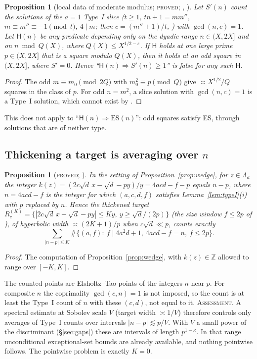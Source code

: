 \documentclass[10pt,reqno]{amsart}
\newtheorem{proposition}[theorem]{Proposition}
\theoremstyle{definition}
\numberwithin{equation}{section}
\newcommand{\Z}{\mathbb Z}
\newcommand{\status}[1]{\textup{\textsc{#1}}}
\begin{document}
\begin{proposition}[local data of moderate modulus; \status{proved}; {\cite[Prop.~7.3]{O127}}, {\cite[Lemma~5.1]{RT1}}]\label{prop:localsize}
Let $S'(n)$ count the solutions of the $a=1$ Type~I slice
($t\ge1$, $tn+1=mm''$, $m\equiv m''\equiv-1\pmod t$, $4\mid m$; then
$c=(m''+1)/t$, \cite[Lemma~1.1]{O127}) with $\gcd(n,c)=1$.
Let $\mathsf H(n)$ be any predicate depending only on the dyadic range
$n\in(X,2X]$ and on $n\bmod Q(X)$, where $Q(X)\le X^{1/2-\varepsilon}$. If
$\mathsf H$ holds at one large prime $p\in(X,2X]$ that is a square modulo
$Q(X)$, then it holds at an odd square in $(X,2X]$, where $S'=0$. Hence
``$\mathsf H(n)\Rightarrow S'(n)\ge1$'' is false for any such $\mathsf H$.
\end{proposition}
\begin{proof}
The odd $m\equiv m_0\pmod{2Q}$ with $m_0^2\equiv p\pmod Q$ give $\asymp X^{1/2}/Q$
squares in the class of $p$. For odd $n=m^2$, a slice solution with
$\gcd(n,c)=1$ is a Type~I solution, which cannot exist by
\cite[Prop.~1.6]{ET}.
\end{proof}
This does not apply to ``$\mathsf H(n)\Rightarrow\mathrm{ES}(n)$'': odd
squares satisfy ES, through solutions that are of neither type.

\subsection{Thickening a target is averaging over $n$}
\begin{proposition}[\status{proved}; {\cite[Prop.~5.4]{O123}}]\label{prop:thick}
In the setting of Proposition~\ref{prop:wedge}, for $z\in\Lambda_d$ the
integer $k(z)=(2c\sqrt d\,x-\sqrt d-py)/y=4acd-f-p$ equals $n-p$, where
$n=4acd-f$ is the integer for which $(a,c,d,f)$ satisfies
Lemma~\ref{lem:typeI}(i) with $p$ replaced by $n$. Hence the thickened target
$R_c^{(K)}=\{|2c\sqrt d\,x-\sqrt d-py|\le Ky,\ y\ge\sqrt d/(2p)\}$
(the size window $f\le2p$ of \cite[Prop.~3.1]{O123}), of hyperbolic width
$\asymp(2K+1)/p$ when $c\sqrt d\ll p$, counts exactly
\[\sum_{|n-p|\le K}\#\{(a,f):\ f\mid4a^2d+1,\ 4acd-f=n,\ f\le2p\}.\]
\end{proposition}
\begin{proof}
The computation of Proposition~\ref{prop:wedge}, with $k(z)\in\Z$ allowed
to range over $[-K,K]$.
\end{proof}
The counted points are Elsholtz--Tao points of the integers $n$ near $p$.
For composite $n$ the coprimality $\gcd(c,n)=1$ is not imposed, so the
count is at least the Type~I count of $n$ with these $(c,d)$, not equal to
it. \status{Assessment.} A spectral estimate at Sobolev scale $V$ (target
width $\asymp1/V$) therefore controls only averages of Type~I counts over
intervals $|n-p|\lesssim p/V$. With $V$ a small power of the discriminant
(\S\ref{sec:gaps}) these are intervals of length $p^{1-\kappa}$. In that
range unconditional exceptional-set bounds are already available, and
nothing pointwise follows. The pointwise problem is exactly $K=0$.
\end{document}
